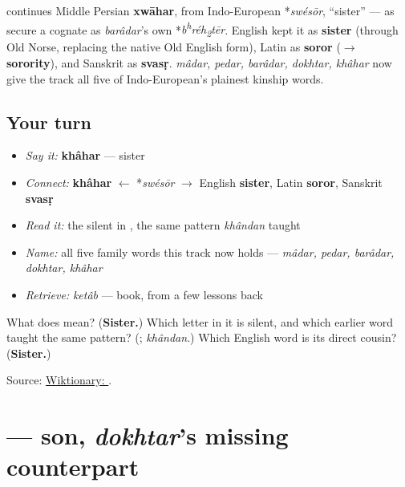 \begin{cousinweb}
\textbf{} continues Middle Persian \textbf{xwāhar}, from Indo-European *\emph{swésōr}, \textquotedblleft{}sister\textquotedblright{} — as secure a cognate as \emph{barâdar}'s own *\emph{b\textsuperscript{h}réh\textsubscript{2}tēr}. English kept it as \textbf{sister} (through Old Norse, replacing the native Old English form), Latin as \textbf{soror} ($\to$ \textbf{sorority}), and Sanskrit as \textbf{svasṛ}. \emph{mâdar, pedar, barâdar, dokhtar, khâhar} now give the track all five of Indo-European's plainest kinship words.
\end{cousinweb}

\subsection*{Your turn}
\begin{itemize}
\raggedright
  \item \emph{Say it:} \textbf{khâhar} — sister
  \item \emph{Connect:} \textbf{khâhar} $\leftarrow$ *\emph{swésōr} $\to$ English \textbf{sister}, Latin \textbf{soror}, Sanskrit \textbf{svasṛ}
  \item \emph{Read it:} the silent \textbf{} in \textbf{}, the same pattern \emph{khândan} taught
  \item \emph{Name:} all five family words this track now holds — \emph{mâdar, pedar, barâdar, dokhtar, khâhar}
  \item \emph{Retrieve:} \emph{ketâb} — book, from a few lessons back
\end{itemize}

\begin{tcolorbox}[breakable,colback=teal!4,colframe=teal!35!black,title={Before you move on}]
What does \textbf{} mean? (\textbf{Sister.}) Which letter in it is silent, and which earlier word taught the same pattern? (\textbf{}; \emph{khândan}.) Which English word is its direct cousin? (\textbf{Sister.})

Source: \href{https://en.wiktionary.org/wiki/\%D8\%AE\%D9\%88\%D8\%A7\%D9\%87\%D8\%B1}{Wiktionary: }.
\end{tcolorbox}
\section[\texorpdfstring{\fa{پسر} (pesar)}{پسر (pesar)}]{ — son, \emph{dokhtar}'s missing counterpart}

